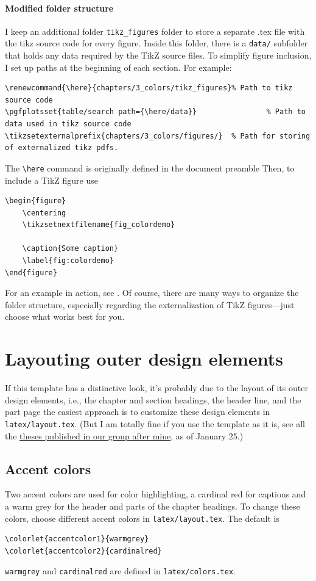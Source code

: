\paragraph{Modified folder structure}
I keep an additional folder \verb|tikz_figures| folder to store a separate .tex file with the tikz source code for every figure. Inside this folder, there is a \verb|data/| subfolder that holds any data required by the TikZ source files. To simplify figure inclusion, I set up paths at the beginning of each section. For example:
\begin{lstlisting}
\renewcommand{\here}{chapters/3_colors/tikz_figures}% Path to tikz source code
\pgfplotsset{table/search path={\here/data}}				% Path to data used in tikz source code
\tikzsetexternalprefix{chapters/3_colors/figures/}	% Path for storing of externalized tikz pdfs.
\end{lstlisting}
The \verb|\here| command is originally defined in the document preamble
Then, to include a TikZ figure use
\begin{lstlisting}
\begin{figure}
	\centering
	\tikzsetnextfilename{fig_colordemo}
	
	\caption{Some caption}
	\label{fig:colordemo}
\end{figure}
\end{lstlisting}
For an example in action, see .
Of course, there are many ways to organize the folder structure, especially regarding the externalization of TikZ figures—just choose what works best for you.

\section[Layouting ``outer'' design elements]{Layouting outer design elements}

If this template has a distinctive look, it's probably due to the layout of its outer design elements, i.e., the chapter and section headings, the header line, and the part page the easiest approach is to customize these design elements in \verb|latex/layout.tex|. (But I am totally fine if you use the template as it is, see all the \href{https://www.thp.uni-koeln.de/trebst/thesisprojects.shtml}{theses published in our group after mine}, as of January 25.)


\subsection{Accent colors}
Two accent colors are used for color highlighting, a cardinal red for captions and a warm grey for the header and parts of the chapter headings. To change these colors, choose different accent colors in \verb|latex/layout.tex|. The default is
\begin{lstlisting}
\colorlet{accentcolor1}{warmgrey}
\colorlet{accentcolor2}{cardinalred}
\end{lstlisting}
\verb|warmgrey| and \verb|cardinalred| are defined in \verb|latex/colors.tex|. 

